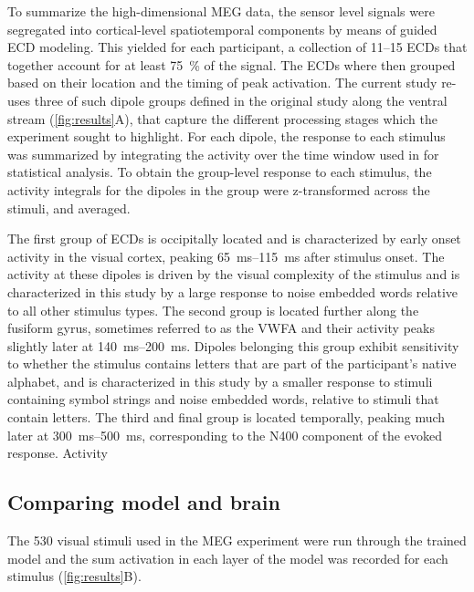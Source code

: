 \documentclass[a4paper, 10pt]{vanvliet_paper}
\begin{document}
To summarize the high-dimensional \gls{MEG} data, the sensor level signals were segregated into cortical-level spatiotemporal components by means of guided \gls{ECD} modeling\cite{Hamalainen1993}.
This yielded for each participant, a collection of 11--15 \glspl{ECD} that together account for at least \SI{75}{\percent} of the signal.
The \glspl{ECD} where then grouped based on their location and the timing of peak activation. 
The current study re-uses three of such dipole groups defined in the original study\cite{Vartiainen2011} along the ventral stream (\autoref{fig:results}A), that capture the different processing stages which the experiment sought to highlight.
For each dipole, the response to each stimulus was summarized by integrating the activity over the time window used in \textcite{Vartiainen2011} for statistical analysis.
To obtain the group-level response to each stimulus, the activity integrals for the dipoles in the group were z-transformed across the stimuli, and averaged.

The first group of \glspl{ECD} is occipitally located and is characterized by early onset activity in the visual cortex, peaking \SIrange{65}{115}{\milli\second} after stimulus onset.
The activity at these dipoles is driven by the visual complexity of the stimulus and is characterized in this study by a large response to noise embedded words relative to all other stimulus types.
The second group is located further along the fusiform gyrus, sometimes referred to as the \gls{VWFA}\cite{Cohen2004} and their activity peaks slightly later at \SIrange{140}{200}{\milli\second}.
Dipoles belonging this group exhibit sensitivity to whether the stimulus contains letters that are part of the participant's native alphabet\cite{Tarkiainen1999}, and is characterized in this study by a smaller response to stimuli containing symbol strings and noise embedded words, relative to stimuli that contain letters.
The third and final group is located temporally, peaking much later at \SIrange{300}{500}{\milli\second}, corresponding to the N400 component of the evoked response\cite{Halgren2002, Helenius1998b, Service2007}.
Activity 




\subsection{Comparing model and brain}

The 530 visual stimuli used in the \gls{MEG} experiment were run through the trained model and the sum activation in each layer of the model was recorded for each stimulus (\autoref{fig:results}B).
\end{document}
